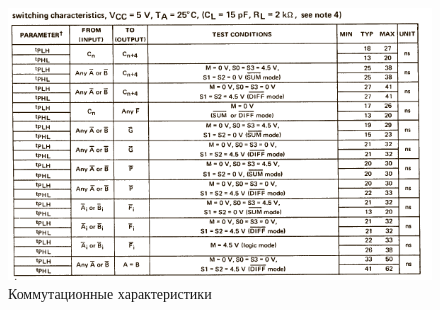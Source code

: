 \begin{figure}[H]
	\centering
	\includegraphics[width=0.95\linewidth]{imgs/15/15_switch}
	\caption{Коммутационные характеристики}
	\label{fig:15_switch}
\end{figure}
